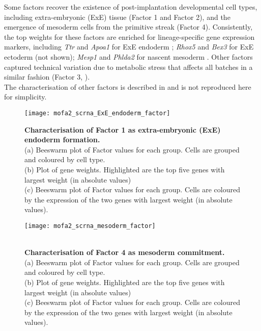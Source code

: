 Some factors recover the existence of post-implantation developmental cell types, including extra-embryonic (ExE) tissue (Factor 1 and Factor 2), and the emergence of mesoderm cells from the primitive streak (Factor 4). Consistently, the top weights for these factors are enriched for lineage-specific gene expression markers, including \textit{Ttr} and \textit{Apoa1} for ExE endoderm ; \textit{Rhox5} and \textit{Bex3} for ExE ectoderm (not shown); \textit{Mesp1} and \textit{Phlda2} for nascent mesoderm . Other factors captured technical variation due to metabolic stress that affects all batches in a similar fashion (Factor 3, ).\\
The characterisation of other factors is described in\cite{Argelaguet2020} and is not reproduced here for simplicity.

\begin{figure}[H]
	\centering
	\texttt{[image: mofa2\_scrna\_ExE\_endoderm\_factor]}
	\caption[]{
	\textbf{Characterisation of Factor 1 as extra-embryonic (ExE) endoderm formation.} \\
	(a) Beeswarm plot of Factor values for each group. Cells are grouped and coloured by cell type. \\
	(b) Plot of gene weights. Highlighted are the top five genes with largest weight (in absolute values) \\
	(c) Beeswarm plot of Factor values for each group. Cells are coloured by the expression of the two genes with largest weight (in absolute values).
	}
	\label{fig:mofa2_scrna_ExE_endoderm_factor}
\end{figure}

\begin{figure}[H]
	\centering
	\texttt{[image: mofa2\_scrna\_mesoderm\_factor]}
	\caption[]{ \\
	\textbf{Characterisation of Factor 4 as mesoderm commitment.} \\
	(a) Beeswarm plot of Factor values for each group. Cells are grouped and coloured by cell type. \\
	(b) Plot of gene weights. Highlighted are the top five genes with largest weight (in absolute values) \\
	(c) Beeswarm plot of Factor values for each group. Cells are coloured by the expression of the two genes with largest weight (in absolute values).
	}
	\label{fig:mofa2_scrna_mesoderm_factor}
\end{figure} 

